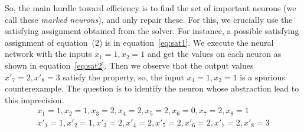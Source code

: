 So, the main hurdle toward efficiency is to find the set of important neurons (we call these {\em marked neurons}), 
and only repair these.  For this, we crucially use the satisfying assignment obtained from the \milp{} solver.
For instance, a possible satisfying assignment of equation~(2)%
is in equation~\ref{eq:sat1}. We execute the neural network with the inputs $x_1=1,x_2=1$ and get the values 
on each neuron as shown in equation~\ref{eq:sat2}. 
Then we observe that the output values $x'_7=2, x'_8=3$ satisfy the property, 
so, the input $x_1=1, x_2=1$ is a spurious counterexample. 
The question is to identify the neuron whose abstraction lead to this imprecision.
\setcounter{equation}{2}
\begin{align}
  x_1=1, x_2=1, x_3=2, x_4=2, x_5=2, x_6=0, x_7=2, x_8=1 \label{eq:sat1} \\
  x'_1=1, x'_2=1, x'_3=2, x'_4=2, x'_5=2, x'_6=2, x'_7=2, x'_8=3 \label{eq:sat2}
\end{align}





